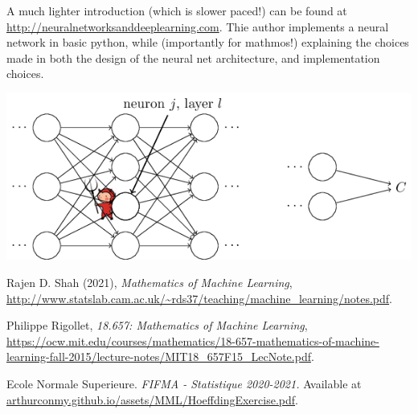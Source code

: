 \documentclass[11pt]{scrartcl}
\begin{document}
\begin{remark}
A much lighter introduction (which is slower paced!) can be found at \url{http://neuralnetworksanddeeplearning.com}. Thie author implements a neural network in basic python, while (importantly for mathmos!) explaining the choices made in both the design of the neural net architecture, and implementation choices.

\begin{center}
\includegraphics[scale=0.5]{demon2.png}
    \label{fig:demon}
\end{center}

\end{remark}

\begin{thebibliography}{9}
Rajen D. Shah (2021), \emph{Mathematics of Machine Learning}, \url{http://www.statslab.cam.ac.uk/~rds37/teaching/machine_learning/notes.pdf}.

Philippe Rigollet, \emph{18.657: Mathematics of Machine Learning}, \url{https://ocw.mit.edu/courses/mathematics/18-657-mathematics-of-machine-learning-fall-2015/lecture-notes/MIT18_657F15_LecNote.pdf}.

Ecole Normale Superieure.
\emph{FIFMA - Statistique 2020-2021.}
Available at \url{arthurconmy.github.io/assets/MML/HoeffdingExercise.pdf}.
\end{thebibliography}
\end{document}
